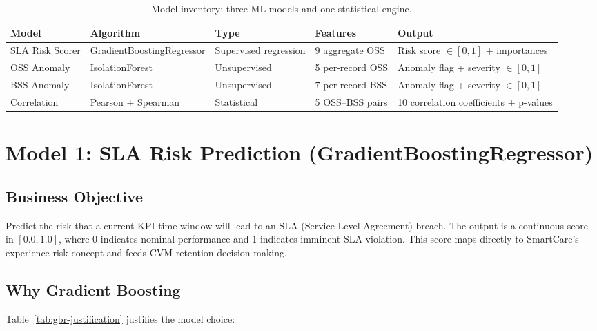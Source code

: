 \begin{table}[H]
\centering
\caption{Model inventory: three ML models and one statistical engine.}
\label{tab:model-overview}
\begin{tabularx}{\textwidth}{@{}llllX@{}}
\toprule
\textbf{Model} & \textbf{Algorithm} & \textbf{Type} & \textbf{Features} & \textbf{Output} \\
\midrule
SLA Risk Scorer & GradientBoostingRegressor & Supervised regression & 9 aggregate OSS & Risk score $\in [0, 1]$ + importances \\
OSS Anomaly & IsolationForest & Unsupervised & 5 per-record OSS & Anomaly flag + severity $\in [0, 1]$ \\
BSS Anomaly & IsolationForest & Unsupervised & 7 per-record BSS & Anomaly flag + severity $\in [0, 1]$ \\
Correlation & Pearson + Spearman & Statistical & 5 OSS--BSS pairs & 10 correlation coefficients + p-values \\
\bottomrule
\end{tabularx}
\end{table}

\section{Model 1: SLA Risk Prediction (GradientBoostingRegressor)}

\subsection{Business Objective}

Predict the risk that a current KPI time window will lead to an SLA (Service Level Agreement) breach. The output is a continuous score in $[0.0, 1.0]$, where 0 indicates nominal performance and 1 indicates imminent SLA violation. This score maps directly to SmartCare's experience risk concept and feeds CVM retention decision-making.

\subsection{Why Gradient Boosting}

Table~\ref{tab:gbr-justification} justifies the model choice:

